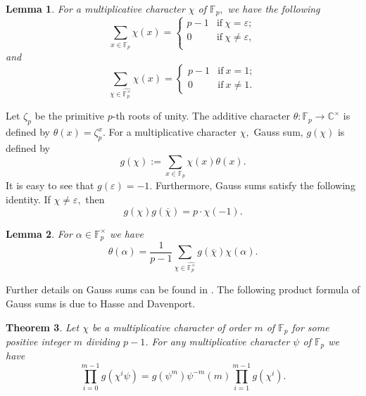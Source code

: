 \documentclass[12pt]{amsart}
\theoremstyle{plain}
\newtheorem{theorem}{Theorem}[section]
\newtheorem{lemma}[theorem]{Lemma}
\theoremstyle{definition}
\theoremstyle{remark}
\newcommand{\F}{\mathbb{F}}
\newcommand{\C}{\mathbb{C}}
\numberwithin{equation}{section}
\begin{document}
 \begin{lemma}\cite[Chapter 8]{rosen}\label{orthogonality}
 For a multiplicative character $\chi$ of $\F_p,$ we have the following
 \begin{equation}
    \sum_{x\in\mathbb{F}_p}\chi{(x)}=\begin{cases} p-1 & \text{if}\   \chi=\varepsilon;\\ 
    0  & \text  {if} \  \chi \neq \varepsilon,\\\
\end{cases}
\end{equation}
and 
\begin{equation}
\sum_{\chi\in\widehat{{\mathbb{F}}_p^\times}}\chi{(x)}=
\begin{cases}p-1 & \text  {if}\   x=1;\\ 
0  & \text  {if} \  x \neq 1.
\end{cases}
\end{equation}
 \end{lemma}
 Let $\zeta_p$ be the primitive $p$-th roots of unity. The additive character $\theta:\mathbb F_p\rightarrow\C^\times$ is defined by $\theta(x)=\zeta_p^x.$ 
 For a multiplicative character $\chi,$ Gauss sum, $g(\chi)$ is defined by $$g(\chi):=\sum_{x\in \mathbb F_p}\chi(x)\theta(x).$$  It is easy to see that $g(\varepsilon)= -1.$ Furthermore, Gauss sums satisfy the following identity. If $\chi\neq\varepsilon,$ then 
\begin{equation}\label{inverse}
    g(\chi)g(\overline{\chi})=
        p\cdot\chi(-1). 
        \end{equation}
        \begin{lemma}\label{lemma-fuselier} \cite[Lemma 2.2]{Fuselier}
        For $\alpha\in\F_p^{\times}$ we have 
        $$
        \theta(\alpha)=\frac{1}{p-1}\sum\limits_{\chi\in\widehat{\F_p^{\times}}}g(\overline{\chi})\chi(\alpha).
        $$
        \end{lemma}
Further details on Gauss sums can be found in \cite{Gauss-Jacobi, rosen}. The following product formula of Gauss sums is due to Hasse and Davenport. 

\begin{theorem}\cite[Hasse-Davenport relation, Theorem 11.3.5]{Gauss-Jacobi} \label{Hasse} 
Let $\chi$ be a multiplicative character of order $m$ of $\mathbb{F}_p$ for some positive integer $m$ dividing $p-1$. For any multiplicative character $\psi$ of $\mathbb{F}_p$ we have 
$$\prod\limits_{i=0}^{m-1}g(\chi^i\psi)=g(\psi^m)\psi^{-m}(m)\prod\limits_{i=1}^{m-1}g(\chi^i).$$
    
\end{theorem}
\end{document}
